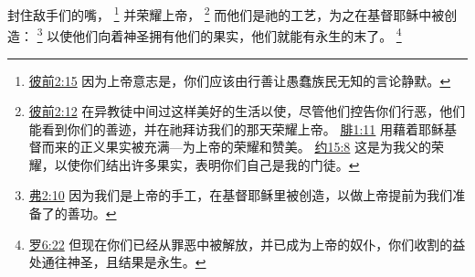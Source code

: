 \documentclass[12pt, a4paper, oneside]{ctexart}
\begin{document}
	封住敌手们的嘴，
	\footnote {
		\href{https://biblehub.com/1_peter/2-15.htm}{彼前2:15} 因为上帝意志是，你们应该由行善让愚蠢族民无知的言论静默。
	}
	并荣耀上帝，
	\footnote {
		\href{https://biblehub.com/1_peter/2-12.htm}{彼前2:12} 在异教徒中间过这样美好的生活以使，尽管他们控告你们行恶，他们能看到你们的善迹，并在祂拜访我们的那天荣耀上帝。
		\href{https://biblehub.com/philippians/1-11.htm}{腓1:11} 用藉着耶稣基督而来的正义果实被充满---为上帝的荣耀和赞美。
		\href{https://biblehub.com/john/15-8.htm}{约15:8} 这是为我父的荣耀，以使你们结出许多果实，表明你们自己是我的门徒。
	}
	而他们是祂的工艺，为之在基督耶稣中被创造：
	\footnote {
		\href{https://biblehub.com/ephesians/2-10.htm}{弗2:10} 因为我们是上帝的手工，在基督耶稣里被创造，以做上帝提前为我们准备了的善功。
	}
	以使他们向着神圣拥有他们的果实，他们就能有永生的末了。
	\footnote {
		\href{https://biblehub.com/romans/6-22.htm}{罗6:22} 但现在你们已经从罪恶中被解放，并已成为上帝的奴仆，你们收割的益处通往神圣，且结果是永生。
	}
\end{document}
